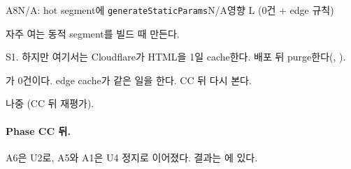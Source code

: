 \begin{checkitem}{\ckna}{A8}{N/A: hot segment에 \texttt{generateStaticParams}}{N/A\ckdot{}영향 L (0건 + edge 규칙)}
  \item[What] 자주 여는 동적 segment를 빌드 때 만든다.
  \item[Why] S1. 하지만 여기서는 Cloudflare가 HTML을 1일 cache한다. 배포 뒤 purge한다(, ).
  \item[How] 가 0건이다. edge cache가 같은 일을 한다. CC 뒤 다시 본다.
  \item[When] 나중 (CC 뒤 재평가).
\end{checkitem}

\paragraph{Phase CC 뒤.}
A6은 U2로, A5와 A1은 U4 정지로 이어졌다. 결과는 에 있다.

